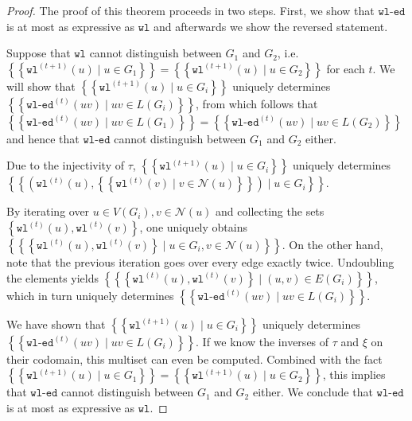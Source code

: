 \documentclass{article}
\newcommand{\set}[1]{\left\{#1\right\}}
\newcommand{\multiset}[1]{\left\{\!\!\left\{#1\right\}\!\!\right\}}
\newcommand{\iter}[1]{^{(#1)}}
\newcommand{\wl}{\texttt{wl}}
\newcommand{\wledge}{\texttt{wl-ed}}
\newcommand{\dec}{\xi}
\newcommand{\hash}{\tau}
\newcommand{\nbh}{\mathcal{N}}
\begin{document}
\begin{proof}
    The proof of this theorem proceeds in two steps. First, we show that $\wledge$ is at most as expressive as $\wl$ and afterwards we show the reversed statement.

    Suppose that $\wl$ cannot distinguish between $G_1$ and $G_2$, i.e. $\multiset{\wl\iter{t+1}(u) \mid u\in G_1} = \multiset{\wl\iter{t+1}(u) \mid u\in G_2}$ for each $t$.
    We will show that $\multiset{\wl\iter{t+1}(u) \mid u\in G_i}$ uniquely determines $\multiset{\wledge\iter{t}(uv) \mid uv\in L(G_i)}$, from which follows that $\multiset{\wledge\iter{t}(uv) \mid uv\in L(G_1)} = \multiset{\wledge\iter{t}(uv) \mid uv\in L(G_2)}$ and hence that $\wledge$ cannot distinguish between $G_1$ and $G_2$ either.
    
    Due to the injectivity of $\hash$,
    $\multiset{\wl\iter{t+1}(u) \mid u\in G_i}$
    uniquely determines
    $\multiset{\left(
        \wl\iter{t}(u),
        \multiset{\wl\iter{t}(v) \mid v\in \nbh(u)}
    \right) \mid u\in G_i}$.

    By iterating over $u\in V(G_i), v\in\nbh(u)$ and collecting the sets $\set{\wl\iter{t}(u), \wl\iter{t}(v)}$, one uniquely obtains $\multiset{\set{\wl\iter{t}(u), \wl\iter{t}(v)} \mid u\in G_i, v\in\nbh(u)}$.
    On the other hand, note that the previous iteration goes over every edge exactly twice. Undoubling the elements yields $\multiset{\set{\wl\iter{t}(u), \wl\iter{t}(v)} \mid (u,v)\in E(G_i)}$, which in turn uniquely determines $\multiset{\wledge\iter{t}(uv) \mid uv\in L(G_i)}$.

    We have shown that $\multiset{\wl\iter{t+1}(u) \mid u\in G_i}$ uniquely determines $\multiset{\wledge\iter{t}(uv) \mid uv\in L(G_i)}$. If we know the inverses of $\hash$ and $\dec$ on their codomain, this multiset can even be computed. Combined with the fact $\multiset{\wl\iter{t+1}(u) \mid u\in G_1} = \multiset{\wl\iter{t+1}(u) \mid u\in G_2}$, this implies that $\wledge$ cannot distinguish between $G_1$ and $G_2$ either. We conclude that $\wledge$ is at most as expressive as $\wl$.



\end{proof}
\end{document}
